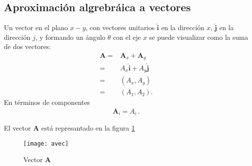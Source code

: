 \subsection{Aproximaci\'on algrebr\'aica  a vectores}

\begin{frame}
Un vector en el plano $x-y$, con vectores unitarios $\hat{\mathbf{i}}$ en la direcci\'on $x$, $\hat{\mathbf{j}}$ en la direcci\'on $j$, y  formando un \'angulo $\theta$ con el eje $x$ se puede visualizar como la suma de dos vectores:
\begin{align}
  \mathbf{A}=&\mathbf{A}_x+\mathbf{A}_y\nonumber\\
            =&A_x\hat{\mathbf{i}}+A_y\hat{\mathbf{j}}\nonumber\\
            =&(A_x,A_y)\nonumber\\
            =&(A_1,A_2).
\end{align}
En t\'erminos de componentes
\begin{align}
  \mathbf{A}_i=A_i\,.
\end{align}

El vector $\mathbf{A}$ está represantado en la figura \ref{fig:avec}
\begin{figure}
  \centering
  \texttt{[image: avec]}
  \caption{Vector $\mathbf{A}$}
\label{fig:avec}
\end{figure}



\end{frame}
